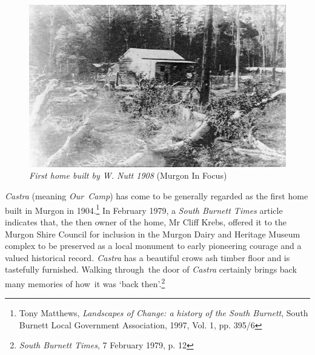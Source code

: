 \begin{figure}
\begin{center}
\includegraphics[width=1.\linewidth,center]{../images/HouseWNutt1908.jpg}
\caption{{\itshape First home built by W. Nutt 1908} {\scriptsize(Murgon In Focus)}}
\end{center}
\end{figure}




\emph{Castra} (meaning \emph{Our~Camp}) has come to be generally regarded as the first home built in Murgon in 1904.\footnote{Tony Matthews, \emph{Landscapes of Change: a history of the South Burnett}, South Burnett Local Government Association, 1997, Vol. 1, pp. 395/6} In February 1979, a \emph{South Burnett Times} article indicates that, the then owner of the home, Mr Cliff Krebs, offered it to the Murgon Shire Council for inclusion in the Murgon Dairy and Heritage Museum complex to be preserved as a local monument to early pioneering courage and a valued historical record\emph{. Castra} has a beautiful crows ash timber floor and is tastefully furnished. Walking through~the door of \emph{Castra} certainly brings back many memories of how~it was `back then'.\footnote{\emph{South Burnett Times}, 7 February 1979, p. 12}








